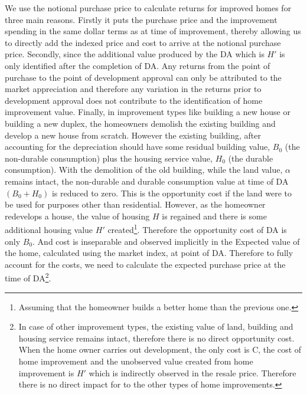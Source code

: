 \documentclass{article}
\begin{document}
We use the notional purchase price to calculate returns for improved homes for three main reasons. Firstly it puts the purchase price and the improvement spending in the same dollar terms as at time of improvement, thereby allowing us to directly add the indexed price and cost to arrive at the notional purchase price. Secondly, since the additional value produced by the DA which is $H'$ is only identified after the completion of DA.  Any returns from the point of purchase to the point of development approval can only be attributed to the market appreciation and therefore any variation in the returns prior to development approval does not contribute to the identification of home improvement value. Finally, in improvement types like building a new house or building a new duplex, the homeowners demolish the existing building and develop a new house from scratch. However the existing building, after accounting for the depreciation should have some residual building value, $B_0$ (the non-durable consumption) plus the housing service value, $H_0$ (the durable consumption). With the demolition of the old building, while the land value, $\alpha$ remains intact, the non-durable and durable consumption value at time of DA $(B_0 + H_0)$ is reduced to zero. This is the opportunity cost if the land were to be used for purposes other than residential. However, as the homeowner redevelops a house, the value of housing $H$ is regained and there is some additional housing value $H'$ created\footnote{Assuming that the homeowner builds a better home than the previous one.}. Therefore the opportunity cost of DA is only $B_0$. And cost is inseparable and observed implicitly in the Expected value of the home, calculated using the market index, at point of DA. Therefore to fully account for the costs, we need to calculate the expected purchase price at the time of DA\footnote{In case of other improvement types, the existing value of land, building and housing service remains intact, therefore there is no direct opportunity cost. When the home owner carries out development, the only cost is C, the cost of home improvement and the unobserved value created from home improvement is $H'$ which is indirectly observed in the resale price. Therefore there is no direct impact for to the other types of home improvements.}. 
\end{document}
